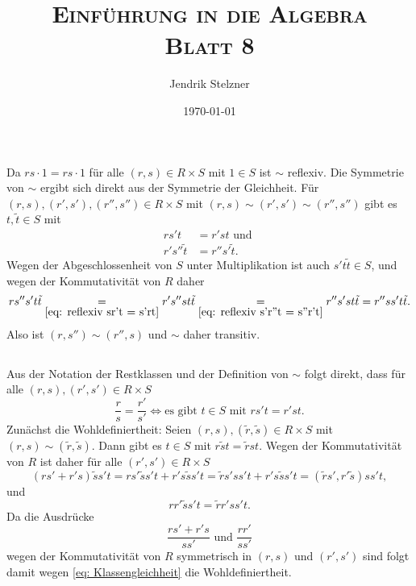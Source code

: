 \documentclass[a4paper,10pt]{article}
\title{\textsc{Einführung in die Algebra \\ \Large Blatt 8}}
\author{Jendrik Stelzner}
\date{\today}
\theoremstyle{definition}
\begin{document}
\maketitle




\section{}


\subsection{}
Da $rs \cdot 1 = rs \cdot 1$ für alle $(r,s) \in R \times S$ mit $1 \in S$ ist $\sim$ reflexiv. Die Symmetrie von $\sim$ ergibt sich direkt aus der Symmetrie der Gleichheit. Für $(r,s), (r',s'), (r'',s'') \in R \times S$ mit $(r,s) \sim (r',s') \sim (r'', s'')$ gibt es $t, \tilde{t} \in S$ mit
\begin{align}
 rs't &= r'st \text{ und }         \label{eq: reflexiv sr't = s'rt} \\
 r's''\tilde{t} &= r''s'\tilde{t}. \label{eq: reflexiv s'r''t = s''r't}
\end{align}
Wegen der Abgeschlossenheit von $S$ unter Multiplikation ist auch $s't\tilde{t} \in S$, und wegen der Kommutativität von $R$ daher
\[
 r s'' s' t \tilde{t}
 \underset{\eqref{eq: reflexiv sr't = s'rt}}= r' s'' s t \tilde{t}
 \underset{\eqref{eq: reflexiv s'r''t = s''r't}}= r'' s' s t \tilde{t}
 = r'' s s' t \tilde{t}.
\]
Also ist $(r,s'') \sim (r'', s)$ und $\sim$ daher transitiv.


\subsection{}
Aus der Notation der Restklassen und der Definition von $\sim$ folgt direkt, dass für alle $(r,s), (r', s') \in R \times S$
\begin{equation} \label{eq: Klassengleichheit}
 \frac{r}{s} = \frac{r'}{s'} \Leftrightarrow \text{es gibt $t \in S$ mit } rs' t = r's t.
\end{equation}
Zunächst die Wohldefiniertheit: Seien $(r,s), (\tilde{r},\tilde{s}) \in R \times S$ mit $(r,s) \sim (\tilde{r},\tilde{s})$. Dann gibt es $t \in S$ mit $r \tilde{s} t = \tilde{r} s t$. Wegen der Kommutativität von $R$ ist daher für alle $(r', s') \in R \times S$
\[
 (rs'+r's) \tilde{s} s' t
 = r s' \tilde{s} s' t + r' s \tilde{s} s' t
 = \tilde{r} s' s s' t + r' s \tilde{s} s' t
 = (\tilde{r} s', r' \tilde{s}) s s ' t,
\]
und
\[
 r r' \tilde{s} s' t = \tilde{r} r' s s' t.
\]
Da die Ausdrücke
\[
 \frac{rs'+r's}{ss'} \text{ und } \frac{r r'}{s s'}
\]
wegen der Kommutativität von $R$ symmetrisch in $(r,s)$ und $(r', s')$ sind folgt damit wegen \eqref{eq: Klassengleichheit} die Wohldefiniertheit. 
\end{document}
